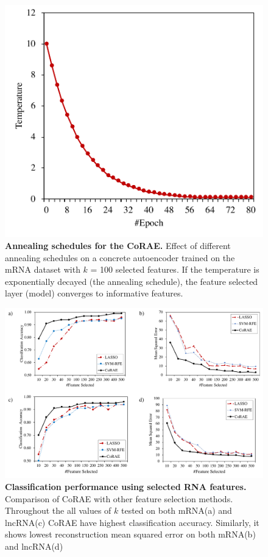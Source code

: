 \documentclass{bioinfo}
\begin{document}
\begin{figure}[h!]
    \centering
    \includegraphics[scale=0.5]{fig/temp-epoch-mRNA.pdf}
    \caption{\textbf{Annealing schedules for the CoRAE.} Effect of different annealing schedules on a concrete autoencoder trained on the mRNA dataset with $k$ = 100 selected features. If the temperature is exponentially decayed (the annealing schedule), the feature selected layer (model) converges to informative features.}
    \label{fig:temp}
\end{figure}

\begin{figure}[hbt]
    \centering
    \includegraphics[scale=0.5]{fig/acc-mse.pdf}
    \caption{\textbf{Classification performance using selected RNA features.}  Comparison of CoRAE with other feature selection methods. Throughout the all values of $k$ tested on both mRNA(a) and lncRNA(c) CoRAE have highest classification accuracy. Similarly, it shows lowest reconstruction mean squared error on both mRNA(b) and lncRNA(d)}
    \label{fig:acc-mse}
  \end{figure}
\end{document}
